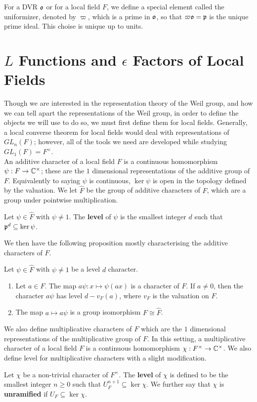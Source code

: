 For a DVR $\mathfrak{o}$ or for a local field $F$, we define a special element called the uniformizer, denoted by $\varpi$, which is a prime in $\mathfrak{o}$, so that $\varpi \mathfrak{o} = \mathfrak{p}$ is the unique prime ideal.
This choise is unique up to units.
\label{sec:Leps-LF}
\section{$L$ Functions and $\epsilon$ Factors of Local Fields}
Though we are interested in the representation theory of the Weil group, and how we can tell apart the representations of the Weil group, in order to define the objects we will use to do so, we must first define them for local fields.
Generally, a local converse theorem for local fields would deal with representations of $GL_n(F)$; however, all of the tools we need are developed while studying $GL_1(F) = F^\times$.\\

An additive character of a local field $F$ is a continuous homomorphism $\psi: F \to \mathbb{C}^\times$; these are the $1$ dimensional representations of the additive group of $F$.
Equivalently to saying $\psi$ is continuous, $\ker \psi$ is open in the topology defined by the valuation.
We let $\hat{F}$ be the group of additive characters of $F$, which are a group under pointwise multiplication.
\begin{defn}
  Let $\psi \in \hat{F}$ with $\psi \neq 1$.
  The \textbf{level} of $\psi$ is the smallest integer $d$ such that $\mathfrak{p}^d \subseteq \ker \psi$.
\end{defn}
We then have the following proposition mostly characterising the additive characters of $F$.
\begin{prop}
  Let $\psi \in \hat{F}$ with $\psi \neq 1$ be a level $d$ character.
  \begin{enumerate}
    \item Let $a \in F$. The map $a \psi : x \mapsto \psi(ax)$ is a character of $F$. If $a \neq 0$, then the character $a \psi$ has level $d - v_F(a)$, where $v_F$ is the valuation on $F$.
    \item The map $a \mapsto a \psi$ is a group isomorphism $F \cong \hat{F}$.
  \end{enumerate}
\end{prop}

We also define multiplicative characters of $F$ which are the $1$ dimensional representations of the multiplicative group of $F$.
In this setting, a multiplicative character of a local field $F$ is a continuous homomorphism $\chi : F^\times \to \mathbb{C}^\times$.
We also define level for multiplicative characters with a slight modification.
\begin{defn}
  Let $\chi$ be a non-trivial character of $F^\times$.
  The \textbf{level} of $\chi$ is defined to be the smallest integer $n \geq 0$ such that $U^{n+1}_F \subseteq \ker \chi$.
  We further say that $\chi$ is \textbf{unramified} if $U_F \subseteq \ker \chi$.
\end{defn}

